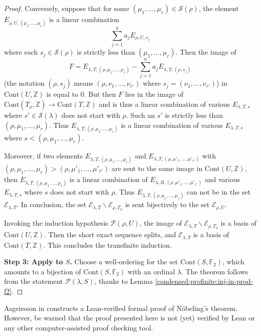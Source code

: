 \begin{proof}
Conversely, suppose that for some $ (\mu _{1}, \ldots, \mu _{r})\in \mathcal{S}(\rho) $, the element
$ E _{\rho, U, (\mu _{1}, \ldots, \mu _{r})} $ is a linear combination
\begin{equation*}
\sum _{j=1}^{n} a _{j} E _{\rho, U, s _{j}}
\end{equation*}
where each $ s _{j}\in \mathscr{S}(\rho) $ is strictly less than $ (\mu _{1}, \ldots, \mu _{r}) $.
Then the image of
\begin{equation*}
F = E _{\lambda, T, (\rho, \mu _{1}, \ldots, \mu _{r})} - \sum _{j=1}^{n} a _{j} E _{\lambda, T, (\rho, s _{j})}
\end{equation*}
(the notation $ (\rho, s _{j}) $ means $ (\rho, \nu _{1}, \ldots, \nu _{r'}) $ where $ s _{j} = (\nu _{1}, \ldots, \nu _{r'}) $)
in $ \mathrm{Cont}(U, \mathbb{Z}) $ is equal to $ 0 $.
But then $ F $ lies in the image of $ \mathrm{Cont}(T _{\rho}, \mathbb{Z})\to \mathrm{Cont}(T, \mathbb{Z}) $
and is thus a linear combination of various $ E _{\lambda, T, s} $ where $ s'\in \mathscr{S}(\lambda) $ does not start with $ \rho $.
Such an $ s' $ is strictly less than $ (\rho, \mu _{1}, \ldots, \mu _{r}) $.
Thus $ E _{\lambda, T, (\rho, \mu _{1}, \ldots, \mu _{r})} $ is a linear combination of various $ E _{\lambda, T, s} $
where $ s < (\rho, \mu _{1}, \ldots, \mu _{r}) $.

Moreover, if two elements $ E _{\lambda, T, (\rho, \mu _{1},\ldots, \mu _{r})} $ and $ E _{\lambda, T, (\rho, \mu'_{1},\ldots,\mu'_{r'})} $
with $ (\rho,\mu _{1},\ldots,\mu _{r}) > (\rho, \mu'_{1},\ldots,\mu'_{r'}) $ are sent to the same image in $ \mathrm{Cont}(U, \mathbb{Z}) $,
then $ E _{\lambda, T, (\rho, \mu _{1}, \ldots,\mu _{r})} $ is a linear combination of $ E _{\lambda, R, (\rho, \mu'_{1},\ldots,\mu'_{r'})} $
and various $ E _{\lambda, T, s} $ where $ s $ does not start with $ \rho $. Thus $ E _{\lambda, T, (\rho, \mu _{1},\ldots, \mu _{r})} $ can not be
in the set $ \mathscr{E}_{\lambda, T} $.
In conclusion, the set $ \mathscr{E}_{\lambda, T}\backslash \mathscr{E}_{\rho, T _{\rho}} $
is sent bijectively to the set $ \mathscr{E}_{\rho, U} $.

Invoking the induction hypothesis $ \mathscr{P}(\rho, U) $,
the image of $ \mathscr{E}_{\lambda, T}\backslash \mathscr{E}_{\rho, T _{\rho}} $
is a basis of $ \mathrm{Cont}(U, \mathbb{Z}) $.
Then the short exact sequence splits, and $ \mathscr{E}_{\lambda, T} $ is a basis of $ \mathrm{Cont}(T, \mathbb{Z}) $.
This concludes the transfinite induction.

\textbf{Step 3: Apply to $ S $.}
Choose a well-ordering for the set $ \mathrm{Cont}(S, \mathbb{F}_{2}) $,
which amounts to a bijection of $ \mathrm{Cont}(S, \mathbb{F}_{2}) $ with an ordinal $ \lambda $.
The theorem follows from the statement $ \mathscr{P}(\lambda, S) $, thanks to Lemma \ref{condensed:profinite:inj-in-prod-f2}.
\end{proof}

\begin{remark}
Asgeirsson in \cite{noebelingformal} constructs a Lean-verified formal proof of Nöbeling's theorem.
However, be warned that the proof presented here is not (yet) verified by Lean or any other computer-assisted proof checking tool.
\end{remark}

